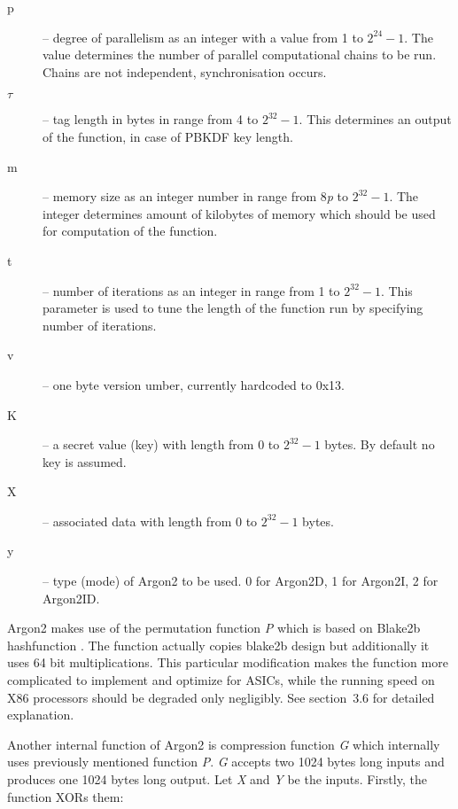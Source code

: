 \documentclass[nolof]{fithesis3}
\begin{document}
\begin{description}
\item[p] -- degree of parallelism as an integer with a value from 1 to \(2^{24} - 1\). The value determines the number of parallel computational chains to be run. Chains are not independent, synchronisation occurs.

\item[\(\tau\)] -- tag length in bytes in range from 4 to \(2^{32} - 1\). This determines an output of the function, in case of PBKDF key length.

\item[m] -- memory size as an integer number in range from 8\emph{p} to \(2^{32} - 1\). The integer determines amount of kilobytes of memory which should be used for computation of the function.

\item[t] -- number of iterations as an integer in range from 1 to \(2^{32} - 1\). This parameter is used to tune the length of the function run by specifying number of iterations.

\item[v] -- one byte version umber, currently hardcoded to 0x13.

\item[K] -- a secret value (key) with length from 0 to \(2^{32} - 1\) bytes. By default no key is assumed.

\item[X] -- associated data with length from 0 to \(2^{32} - 1\) bytes.

\item[y] -- type (mode) of Argon2 to be used. 0 for Argon2D, 1 for Argon2I, 2 for Argon2ID.
\end{description}

Argon2 makes use of the permutation function \emph{P} which is based on Blake2b hashfunction \parencite{blake2}. The function actually copies blake2b design but additionally it uses 64 bit multiplications. This particular modification makes the function more complicated to implement and optimize for ASICs, while the running speed on X86 processors should be degraded only negligibly. See \parencite{argon2draft}{section~3.6} for detailed explanation.

Another internal function of Argon2 is compression function \emph{G} which internally uses previously mentioned function \emph{P}. \emph{G} accepts two 1024 bytes long inputs and produces one 1024 bytes long output. Let \emph{X} and \emph{Y} be the inputs. Firstly, the function XORs them:
\end{document}
